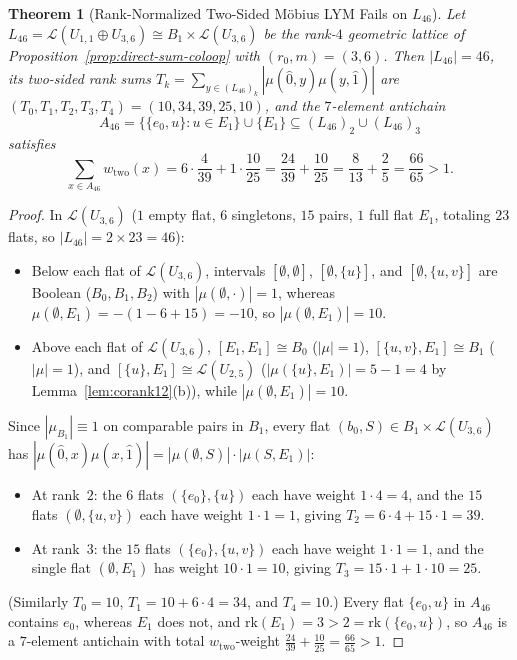 \documentclass[11pt]{article}
\newtheorem{theorem}{Theorem}[section]
\theoremstyle{definition}
\theoremstyle{remark}
\newcommand{\rk}{\mathrm{rk}}
\begin{document}
\begin{theorem}[Rank-Normalized Two-Sided M\"obius LYM Fails on $L_{46}$]\label{thm:L46}
Let $L_{46} = \mathcal{L}(U_{1,1} \oplus U_{3,6}) \cong B_1 \times \mathcal{L}(U_{3,6})$ be the rank-$4$ geometric lattice of Proposition~\ref{prop:direct-sum-coloop} with $(r_0, m) = (3, 6)$. Then $|L_{46}| = 46$, its two-sided rank sums $T_k = \sum_{y \in (L_{46})_k} |\mu(\hat{0}, y)\mu(y, \hat{1})|$ are $(T_0, T_1, T_2, T_3, T_4) = (10, 34, 39, 25, 10)$, and the $7$-element antichain
\[
  A_{46} = \bigl\{\{e_0, u\} : u \in E_1\bigr\} \cup \{E_1\} \subseteq (L_{46})_2 \cup (L_{46})_3
\]
satisfies
\begin{equation}\label{eq:L46-violation}
  \sum_{x \in A_{46}} w_{\mathrm{two}}(x) = 6 \cdot \frac{4}{39} + 1 \cdot \frac{10}{25} = \frac{24}{39} + \frac{10}{25} = \frac{8}{13} + \frac{2}{5} = \frac{66}{65} > 1.
\end{equation}
\end{theorem}
\begin{proof}
In $\mathcal{L}(U_{3,6})$ ($1$ empty flat, $6$ singletons, $15$ pairs, $1$ full flat $E_1$, totaling $23$ flats, so $|L_{46}| = 2 \times 23 = 46$):
\begin{itemize}
\item Below each flat of $\mathcal{L}(U_{3,6})$, intervals $[\emptyset, \emptyset]$, $[\emptyset, \{u\}]$, and $[\emptyset, \{u,v\}]$ are Boolean ($B_0, B_1, B_2$) with $|\mu(\emptyset, \cdot)| = 1$, whereas $\mu(\emptyset, E_1) = -(1 - 6 + 15) = -10$, so $|\mu(\emptyset, E_1)| = 10$.
\item Above each flat of $\mathcal{L}(U_{3,6})$, $[E_1, E_1] \cong B_0$ ($|\mu| = 1$), $[\{u,v\}, E_1] \cong B_1$ ($|\mu| = 1$), and $[\{u\}, E_1] \cong \mathcal{L}(U_{2,5})$ ($|\mu(\{u\}, E_1)| = 5 - 1 = 4$ by Lemma~\ref{lem:corank12}(b)), while $|\mu(\emptyset, E_1)| = 10$.
\end{itemize}
Since $|\mu_{B_1}| \equiv 1$ on comparable pairs in $B_1$, every flat $(b_0, S) \in B_1 \times \mathcal{L}(U_{3,6})$ has $|\mu(\hat{0}, x)\mu(x, \hat{1})| = |\mu(\emptyset, S)| \cdot |\mu(S, E_1)|$:
\begin{itemize}
\item At rank~$2$: the $6$ flats $(\{e_0\}, \{u\})$ each have weight $1 \cdot 4 = 4$, and the $15$ flats $(\emptyset, \{u, v\})$ each have weight $1 \cdot 1 = 1$, giving $T_2 = 6 \cdot 4 + 15 \cdot 1 = 39$.
\item At rank~$3$: the $15$ flats $(\{e_0\}, \{u, v\})$ each have weight $1 \cdot 1 = 1$, and the single flat $(\emptyset, E_1)$ has weight $10 \cdot 1 = 10$, giving $T_3 = 15 \cdot 1 + 1 \cdot 10 = 25$.
\end{itemize}
(Similarly $T_0 = 10$, $T_1 = 10 + 6 \cdot 4 = 34$, and $T_4 = 10$.) Every flat $\{e_0, u\}$ in $A_{46}$ contains $e_0$, whereas $E_1$ does not, and $\rk(E_1) = 3 > 2 = \rk(\{e_0, u\})$, so $A_{46}$ is a $7$-element antichain with total $w_{\mathrm{two}}$-weight $\frac{24}{39} + \frac{10}{25} = \frac{66}{65} > 1$.
\end{proof}
\end{document}

